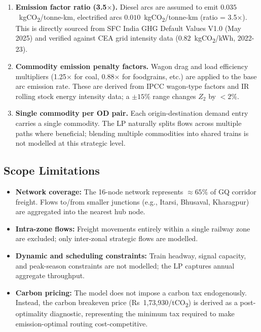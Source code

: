 \documentclass[11pt, a4paper]{article}
\numberwithin{equation}{section}
\numberwithin{figure}{section}
\numberwithin{table}{section}
\begin{document}
\begin{enumerate}[leftmargin=*, label=\textbf{A\arabic*.}]
    \item \textbf{Emission factor ratio (3.5$\times$).}
    Diesel arcs are assumed to emit $0.035$~kgCO\textsubscript{2}/tonne-km, electrified arcs $0.010$~kgCO\textsubscript{2}/tonne-km (ratio = 3.5$\times$). This is directly sourced from SFC India GHG Default Values V1.0 (May 2025) and verified against CEA grid intensity data ($0.82$~kgCO\textsubscript{2}/kWh, 2022-23).

    \item \textbf{Commodity emission penalty factors.}
    Wagon drag and load efficiency multipliers (1.25$\times$ for coal, 0.88$\times$ for foodgrains, etc.) are applied to the base arc emission rate. These are derived from IPCC wagon-type factors and IR rolling stock energy intensity data; a $\pm 15\%$ range changes $Z_2$ by $< 2\%$.

    \item \textbf{Single commodity per OD pair.}
    Each origin-destination demand entry carries a single commodity. The LP naturally splits flows across multiple paths where beneficial; blending multiple commodities into shared trains is not modelled at this strategic level.

\end{enumerate}

\subsection{Scope Limitations}

\begin{itemize}
    \item \textbf{Network coverage:} The 16-node network represents $\approx 65\%$ of GQ corridor freight. Flows to/from smaller junctions (e.g., Itarsi, Bhusaval, Kharagpur) are aggregated into the nearest hub node.
    \item \textbf{Intra-zone flows:} Freight movements entirely within a single railway zone are excluded; only inter-zonal strategic flows are modelled.
    \item \textbf{Dynamic and scheduling constraints:} Train headway, signal capacity, and peak-season constraints are not modelled; the LP captures annual aggregate throughput.
    \item \textbf{Carbon pricing:} The model does not impose a carbon tax endogenously. Instead, the carbon breakeven price (Rs~1,73,930/tCO\textsubscript{2}) is derived as a post-optimality diagnostic, representing the minimum tax required to make emission-optimal routing cost-competitive.
\end{itemize}
\end{document}

